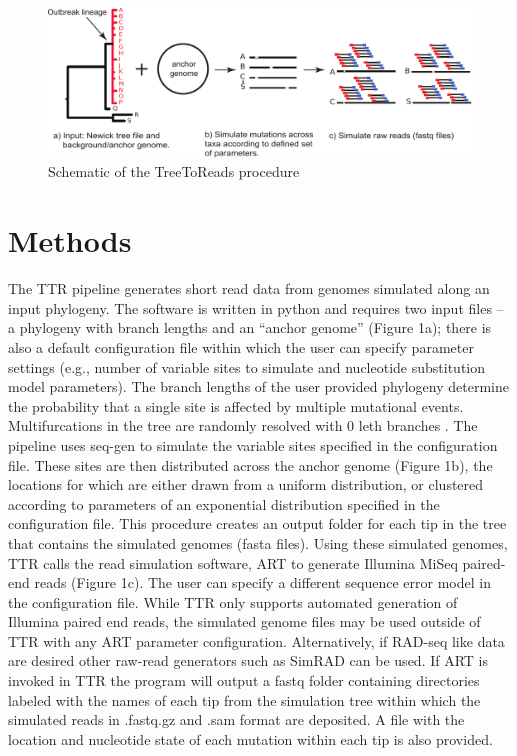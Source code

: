 \begin{figure}[trees]
\includegraphics[width=\textwidth]{TTR-figure}
\caption{Schematic of the TreeToReads procedure}
\label{scheme}
\end{figure}

\section{Methods}
The TTR pipeline generates short read data from genomes simulated along an input phylogeny. 
The software is written in python and requires two input files – a phylogeny with branch lengths and an “anchor genome” (Figure 1a); 
there is also a default configuration file within which the user can specify parameter settings (e.g., number of variable sites to simulate and nucleotide substitution model parameters). 
The branch lengths of the user provided phylogeny determine the probability that a single site is affected by multiple mutational events.
Multifurcations in the tree are randomly resolved with 0 leth branches \citep{sukumaran_dendropy:_2010}.
The pipeline uses seq-gen \citep{rambaut_seq-gen:_1997} to simulate the variable sites specified in the configuration file. 
These sites are then distributed across the anchor genome (Figure 1b), the locations for which are either drawn from a uniform distribution, 
or clustered according to parameters of an exponential distribution specified in the configuration file. 
This procedure creates an output folder for each tip in the tree that contains the simulated genomes (fasta files). Using these simulated genomes, 
TTR calls the read simulation software, ART \citep{huang_art:_2012} to generate Illumina MiSeq paired-end reads (Figure 1c). 
The user can specify a different sequence error model in the configuration file. 
While TTR only supports automated generation of Illumina paired end reads, the simulated genome files may be used outside of TTR with any ART parameter configuration. 
Alternatively, if RAD-seq like data are desired other raw-read generators such as SimRAD \citep{lepais_simrad:_2014} can be used. 
If ART is invoked in TTR the program will output a fastq folder containing directories labeled with the names of each tip from the 
simulation tree within which the simulated reads in .fastq.gz and .sam format are deposited. 
A file with the location and nucleotide state of each mutation within each tip is also provided.



